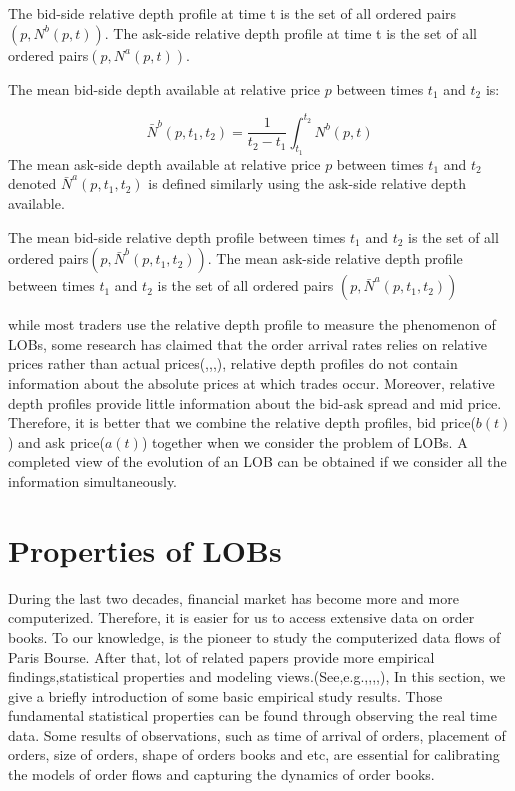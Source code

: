 \begin{defn}
The bid-side relative depth profile at time t is the set of all ordered pairs$(p,N^b(p,t)).$ The ask-side relative depth profile at time t is the set of all ordered pairs$(p,N^a(p,t))$.
\end{defn}

\begin{defn}
The mean bid-side depth available at relative price $p$ between times $t_1$ and $t_2$ is:

\begin{equation*}
\bar{N}^b(p,t_1,t_2)=\frac{1}{t_2-t_1}\int_{t_1}^{t_2}N^b(p,t)
\end{equation*}
The mean ask-side depth available at relative price $p$ between times $t_1$ and $t_2$ denoted $\bar{N}^a(p,t_1,t_2)$ is defined similarly using the ask-side relative depth available.
\end{defn}

\begin{defn}
The mean bid-side relative depth profile between times $t_1$ and $t_2$ is the set of all ordered pairs$(p,\bar{N}^b(p,t_1,t_2))$. The mean ask-side relative depth profile between times $t_1$ and $t_2$ is the set of all ordered pairs $(p,\bar{N}^a(p,t_1,t_2))$ 
\end{defn}

while most traders use the relative depth profile to measure the phenomenon of LOBs, some research has claimed that the order arrival rates relies on relative prices rather than actual prices(\cite{biais1995empirical},\cite{bouchaud2002statistical},\cite{potters2003more},\cite{zovko2002power}), relative depth profiles do not contain information about the absolute prices at which trades occur. Moreover, relative depth profiles provide little information about the bid-ask spread and mid price. Therefore, it is better that we combine the relative depth profiles, bid price($b(t)$) and ask price($a(t)$) together when we consider the problem of LOBs. A completed view of the evolution of an LOB can be obtained if we consider all the information simultaneously.

\section{Properties of LOBs}
During the last two decades, financial market has become more and more computerized. Therefore, it is easier for us to access extensive data on order books. To our knowledge, \cite{biais1995empirical} is the pioneer to study the computerized data flows of Paris Bourse. After that, lot of related papers provide more empirical findings,statistical properties and modeling views.(See,e.g.\cite{gopikrishnan2000statistical},\cite{challet2001analyzing},\cite{maslov2001price},\cite{bouchaud2002statistical},\cite{potters2003more}), In this section, we give a briefly introduction of some basic empirical study results. Those fundamental statistical properties can be found through observing the real time data. Some results of observations, such as time of arrival of orders, placement of orders, size of orders, shape of orders books and etc, are essential for calibrating the models of order flows and capturing the dynamics of order books. 

